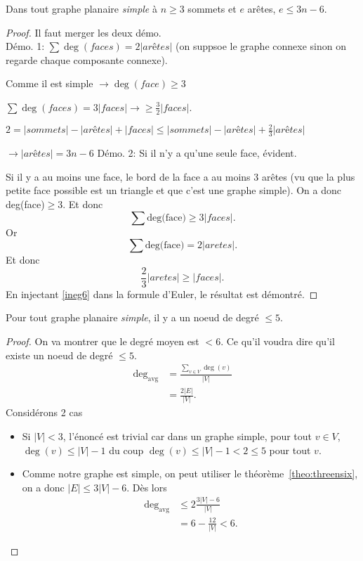 \begin{mytheo}
  \label{theo:threensix}
  Dans tout graphe planaire \emph{simple} à $n \geq 3$ sommets et $e$ arêtes,
  $e \leq 3n - 6$.
  \begin{proof}
  Il faut merger les deux démo. \addTODO \\
  Démo. 1:
    $\sum \deg(faces) = 2 |arêtes|$ (on suppsoe le graphe connexe sinon on regarde chaque composante connexe).  
      
    Comme il est simple $\rightarrow \deg(face) \geq 3$
    
    $\sum \deg(faces) = 3 |faces| \rightarrow \geq \frac{3}{2}|faces|$.
    
    $2 = |sommets|-|arêtes| + |faces| \leq |sommets|-|arêtes| + \frac{2}{3}|arêtes|$
    
    $\rightarrow |arêtes| = 3n-6$
  \newline
  Démo. 2:
    Si il n'y a qu'une seule face, évident. 
    
    Si il y a au moins une face, le bord de la face a au moins 3 arêtes (vu que la plus petite face possible est un triangle et que c'est une graphe simple). On a donc deg(face)$\geq 3$. Et donc $$\sum \text{deg(face)} \geq 3 |faces| .$$
Or    $$\sum \text{deg(face)} = 2 |aretes|.$$
Et donc 
 \begin{equation} \label{ineg6}
 \frac{2}{3} |aretes| \geq |faces|.
\end{equation} 
    En injectant \ref{ineg6} dans la formule d'Euler, le résultat est démontré.   
  \end{proof}
\end{mytheo}

\begin{mytheo}
  Pour tout graphe planaire \emph{simple}, il y a un noeud de degré $\leq 5$.
  \begin{proof}
    On va montrer que le degré moyen est $< 6$.
    Ce qu'il voudra dire qu'il existe un noeud de degré $\leq 5$.
    \begin{align*}
      \deg_{\mathrm{avg}} & = \frac{\sum_{v\in V} \deg(v)}{|V|}\\
                          & = \frac{2|E|}{|V|}.
    \end{align*}
    Considérons 2 cas
    \begin{itemize}
      \item Si $|V| < 3$, l'énoncé est trivial car dans un graphe simple,
        pour tout $v \in V$, $\deg(v) \leq |V|-1$ du coup
        $\deg(v) \leq |V| - 1 < 2 \leq 5$ pour tout $v$.
      \item
        Comme notre graphe est simple,
        on peut utiliser le théorème~\ref{theo:threensix},
        on a donc $|E| \leq 3|V| - 6$.
        Dès lors
        \begin{align*}
          \deg_{\mathrm{avg}} & \leq 2\frac{3|V|-6}{|V|}\\
                              & = 6 - \frac{12}{|V|} < 6.
        \end{align*}
    \end{itemize}
  \end{proof}
\end{mytheo}

